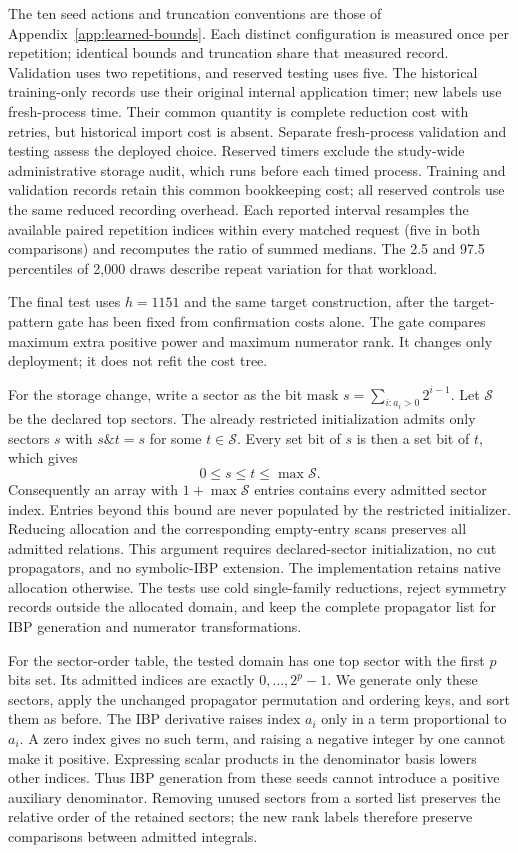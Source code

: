 The ten seed actions and truncation conventions are those of Appendix~\ref{app:learned-bounds}. Each distinct configuration is measured once per repetition; identical bounds and truncation share that measured record. Validation uses two repetitions, and reserved testing uses five. The historical training-only records use their original internal application timer; new labels use fresh-process time. Their common quantity is complete reduction cost with retries, but historical import cost is absent. Separate fresh-process validation and testing assess the deployed choice. Reserved timers exclude the study-wide administrative storage audit, which runs before each timed process. Training and validation records retain this common bookkeeping cost; all reserved controls use the same reduced recording overhead. Each reported interval resamples the available paired repetition indices within every matched request (five in both comparisons) and recomputes the ratio of summed medians. The 2.5 and 97.5 percentiles of 2,000 draws describe repeat variation for that workload.

The final test uses $h=1151$ and the same target construction, after the target-pattern gate has been fixed from confirmation costs alone. The gate compares maximum extra positive power and maximum numerator rank. It changes only deployment; it does not refit the cost tree.

For the storage change, write a sector as the bit mask $s=\sum_{i:a_i>0}2^{i-1}$. Let $\mathcal S$ be the declared top sectors. The already restricted initialization admits only sectors $s$ with $s\mathbin{\&}t=s$ for some $t\in\mathcal S$. Every set bit of $s$ is then a set bit of $t$, which gives
\begin{equation}
 0\le s\le t\le\max\mathcal S.
\end{equation}
Consequently an array with $1+\max\mathcal S$ entries contains every admitted sector index. Entries beyond this bound are never populated by the restricted initializer. Reducing allocation and the corresponding empty-entry scans preserves all admitted relations. This argument requires declared-sector initialization, no cut propagators, and no symbolic-IBP extension. The implementation retains native allocation otherwise. The tests use cold single-family reductions, reject symmetry records outside the allocated domain, and keep the complete propagator list for IBP generation and numerator transformations.

For the sector-order table, the tested domain has one top sector with the first $p$ bits set. Its admitted indices are exactly $0,\ldots,2^p-1$. We generate only these sectors, apply the unchanged propagator permutation and ordering keys, and sort them as before. The IBP derivative raises index $a_i$ only in a term proportional to $a_i$. A zero index gives no such term, and raising a negative integer by one cannot make it positive. Expressing scalar products in the denominator basis lowers other indices. Thus IBP generation from these seeds cannot introduce a positive auxiliary denominator. Removing unused sectors from a sorted list preserves the relative order of the retained sectors; the new rank labels therefore preserve comparisons between admitted integrals.

